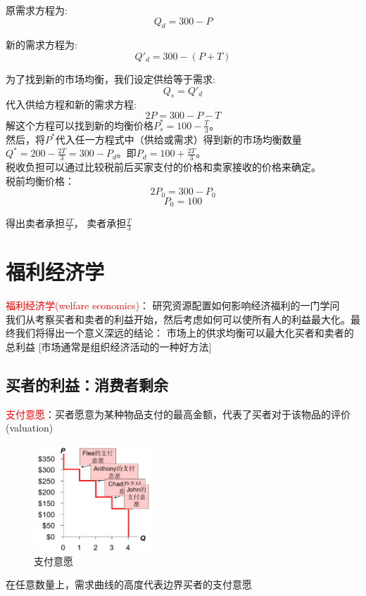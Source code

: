 \documentclass[12pt,a4paper]{article}
\begin{document}
原需求方程为: 
\[Q_d = 300 - P\]

新的需求方程为: 
\[Q'_d = 300 - (P + T)\]

为了找到新的市场均衡，我们设定供给等于需求:
\[Q_s = Q'_d\]
代入供给方程和新的需求方程:
\[2P = 300 - P - T\]
解这个方程可以找到新的均衡价格\(P_s^*=100 - \frac{T}{3}\)。\\

然后，将\(P^*\)代入任一方程式中（供给或需求）得到新的市场均衡数量\(Q^* = 200-\frac{2T}{3} = 300 - P_d\)。即\(P_d = 100 + \frac{2T}{3}\)。\\

税收负担可以通过比较税前后买家支付的价格和卖家接收的价格来确定。\\

税前均衡价格：
\[2P_0 = 300 - P_0\] 
\[P_0 = 100\]

得出卖者承担\(\frac{2T}{3}\)， 卖者承担\(\frac{T}{3}\)







\section{福利经济学}
\textcolor{red}{福利经济学(welfare economics)}： 研究资源配置如何影响经济福利的一门学问\\

我们从考察买者和卖者的利益开始，然后考虑如何可以使所有人的利益最大化。最终我们将得出一个意义深远的结论： 市场上的供求均衡可以最大化买者和卖者的总利益 [市场通常是组织经济活动的一种好方法]
\subsection{买者的利益：消费者剩余}
\textcolor{red}{支付意愿}：买者愿意为某种物品支付的最高金额，代表了买者对于该物品的评价(valuation)
\begin{figure}[H] 
  \centering %
  \includegraphics[width=0.4\textwidth]{支付意愿.png} 
  \caption{支付意愿} %
\end{figure}
在任意数量上，需求曲线的高度代表边界买者的支付意愿\\
\end{document}
